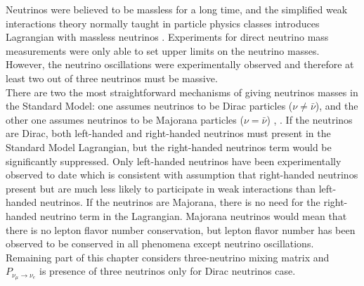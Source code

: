 Neutrinos were believed to be massless for a long time, and the simplified weak interactions theory normally taught in particle physics classes introduces Lagrangian with massless neutrinos \cite{ref_Griffiths}. Experiments for direct neutrino mass measurements were only able to set upper limits on the neutrino masses. However, the neutrino oscillations were experimentally observed and therefore at least two out of three neutrinos must be massive. \\

There are two the most straightforward mechanisms of giving neutrinos masses in the Standard Model: one assumes neutrinos to be Dirac particles ($\nu \neq \bar{\nu}$), and the other one assumes neutrinos to be Majorana particles ($\nu = \bar{\nu}$) \cite{ref_PDG}, \cite{ref_theory_Osc}. If the neutrinos are Dirac, both left-handed and right-handed neutrinos must present in the Standard Model Lagrangian, but the right-handed neutrinos term would be significantly suppressed. Only left-handed neutrinos have been experimentally observed to date which is consistent with assumption that right-handed neutrinos present but are much less likely to participate in weak interactions than left-handed neutrinos. If the neutrinos are Majorana, there is no need for the right-handed neutrino term in the Lagrangian. Majorana neutrinos would mean that there is no lepton flavor number conservation, but lepton flavor number has been observed to be conserved in all phenomena except neutrino oscillations. \\

Remaining part of this chapter considers three-neutrino mixing matrix and $P_{\nu_\mu \rightarrow \nu_e}$ is presence of three neutrinos only for Dirac neutrinos case.\\ 


